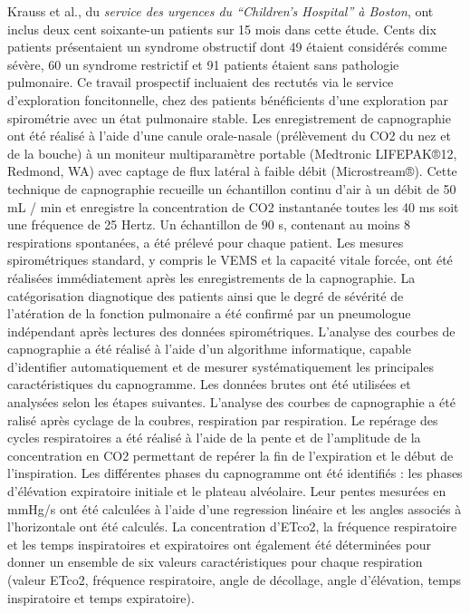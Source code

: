 \documentclass[12pt,]{article}
\begin{document}
Krauss et al., du \emph{service des urgences du ``Children's Hospital''
à Boston}, ont inclus deux cent soixante-un patients sur 15 mois dans
cette étude. Cents dix patients présentaient un syndrome obstructif dont
49 étaient considérés comme sévère, 60 un syndrome restrictif et 91
patients étaient sans pathologie pulmonaire. Ce travail prospectif
incluaient des rectutés via le service d'exploration foncitonnelle, chez
des patients bénéficients d'une exploration par spirométrie avec un état
pulmonaire stable. Les enregistrement de capnographie ont été réalisé à
l'aide d'une canule orale-nasale (prélèvement du CO2 du nez et de la
bouche) à un moniteur multiparamètre portable (Medtronic LIFEPAK®12,
Redmond, WA) avec captage de flux latéral à faible débit (Microstream®).
Cette technique de capnographie recueille un échantillon continu d'air à
un débit de 50 mL / min et enregistre la concentration de CO2
instantanée toutes les 40 ms soit une fréquence de 25 Hertz. Un
échantillon de 90 s, contenant au moins 8 respirations spontanées, a été
prélevé pour chaque patient. Les mesures spirométriques standard, y
compris le VEMS et la capacité vitale forcée, ont été réalisées
immédiatement après les enregistrements de la capnographie. La
catégorisation diagnotique des patients ainsi que le degré de sévérité
de l'atération de la fonction pulmonaire a été confirmé par un
pneumologue indépendant après lectures des données spirométriques.
L'analyse des courbes de capnographie a été réalisé à l'aide d'un
algorithme informatique, capable d'identifier automatiquement et de
mesurer systématiquement les principales caractéristiques du
capnogramme. Les données brutes ont été utilisées et analysées selon les
étapes suivantes. L'analyse des courbes de capnographie a été ralisé
après cyclage de la coubres, respiration par respiration. Le repérage
des cycles respiratoires a été réalisé à l'aide de la pente et de
l'amplitude de la concentration en CO2 permettant de repérer la fin de
l'expiration et le début de l'inspiration. Les différentes phases du
capnogramme ont été identifiés : les phases d'élévation expiratoire
initiale et le plateau alvéolaire. Leur pentes mesurées en mmHg/s ont
été calculées à l'aide d'une regression linéaire et les angles associés
à l'horizontale ont été calculés. La concentration d'ETco2, la fréquence
respiratoire et les temps inspiratoires et expiratoires ont également
été déterminées pour donner un ensemble de six valeurs caractéristiques
pour chaque respiration (valeur ETco2, fréquence respiratoire, angle de
décollage, angle d'élévation, temps inspiratoire et temps expiratoire).
\end{document}
